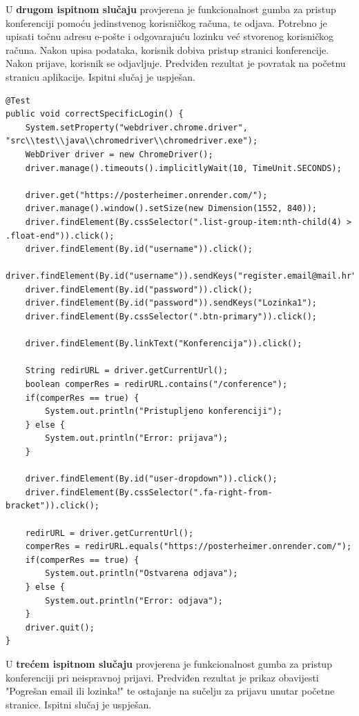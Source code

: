 			U \textbf{drugom ispitnom slučaju} provjerena je funkcionalnost gumba za pristup konferenciji pomoću jedinstvenog korisničkog računa, te odjava. Potrebno je upisati točnu adresu e-pošte i odgovarajuću lozinku već stvorenog korisničkog računa. Nakon upisa podataka, korisnik dobiva pristup stranici konferencije. Nakon prijave, korisnik se odjavljuje. Predviđen rezultat je povratak na početnu stranicu aplikacije. Ispitni slučaj je uspješan.  

			
			\begin{lstlisting}
@Test
public void correctSpecificLogin() {
	System.setProperty("webdriver.chrome.driver", "src\\test\\java\\chromedriver\\chromedriver.exe");
	WebDriver driver = new ChromeDriver();
	driver.manage().timeouts().implicitlyWait(10, TimeUnit.SECONDS);
	
	driver.get("https://posterheimer.onrender.com/");
	driver.manage().window().setSize(new Dimension(1552, 840));
	driver.findElement(By.cssSelector(".list-group-item:nth-child(4) > .float-end")).click();
	driver.findElement(By.id("username")).click();
	driver.findElement(By.id("username")).sendKeys("register.email@mail.hr");
	driver.findElement(By.id("password")).click();
	driver.findElement(By.id("password")).sendKeys("Lozinka1");
	driver.findElement(By.cssSelector(".btn-primary")).click();
	
	driver.findElement(By.linkText("Konferencija")).click();
	
	String redirURL = driver.getCurrentUrl();
	boolean comperRes = redirURL.contains("/conference");
	if(comperRes == true) {
		System.out.println("Pristupljeno konferenciji");
	} else {
		System.out.println("Error: prijava");
	}
	
	driver.findElement(By.id("user-dropdown")).click();
	driver.findElement(By.cssSelector(".fa-right-from-bracket")).click();
	
	redirURL = driver.getCurrentUrl();
	comperRes = redirURL.equals("https://posterheimer.onrender.com/");
	if(comperRes == true) {
		System.out.println("Ostvarena odjava");
	} else {
		System.out.println("Error: odjava");
	}
	driver.quit();
}	
			\end{lstlisting}
			
			
			U \textbf{trećem ispitnom slučaju} provjerena je funkcionalnost gumba za pristup konferenciji pri neispravnoj prijavi. Predviđen rezultat je prikaz obavijesti "Pogrešan email ili lozinka!" te ostajanje na sučelju za prijavu unutar početne stranice. Ispitni slučaj je uspješan.
			

